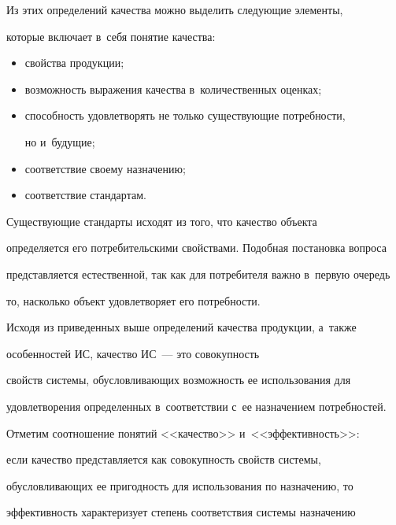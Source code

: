      Из этих определений качества можно выделить сле\-ду\-ющие элементы, 

которые включает в~себя понятие качества:

     \begin{itemize}

     \item  свойства продукции;

     \item возможность выражения качества в~количественных оценках;

     \item способность удовлетворять не только существующие по\-треб\-но\-сти, 

но и~будущие;

     \item соответствие своему назначению;

     \item соответствие стандартам.

     \end{itemize}

     

     Существующие стандарты исходят из того, что качество объекта 

определяется его потребительскими свойствами. Подобная постановка вопроса 

представляется естественной, так как для по\-тре\-би\-те\-ля важ\-но в~первую очередь 

то, насколько объект удовлетворяет его по\-треб\-ности. 

     

     Исходя из приведенных выше определений качества продукции, а~так\-же 

особенностей ИС, качество ИС~--- это со\-во\-куп\-ность 

свойств сис\-те\-мы, обуслов\-ли\-ва\-ющих воз\-мож\-ность ее использования для 

удовлетворения определенных в~соответствии с~ее назначением потребностей.

     

     Отметим соотношение понятий <<качество>> и~<<эффективность>>: 

если качество представляется как со\-во\-куп\-ность свойств сис\-те\-мы, 

обусловливающих ее пригодность для использования по назначению, то 

эффективность характеризует степень соответствия сис\-те\-мы назначению 

